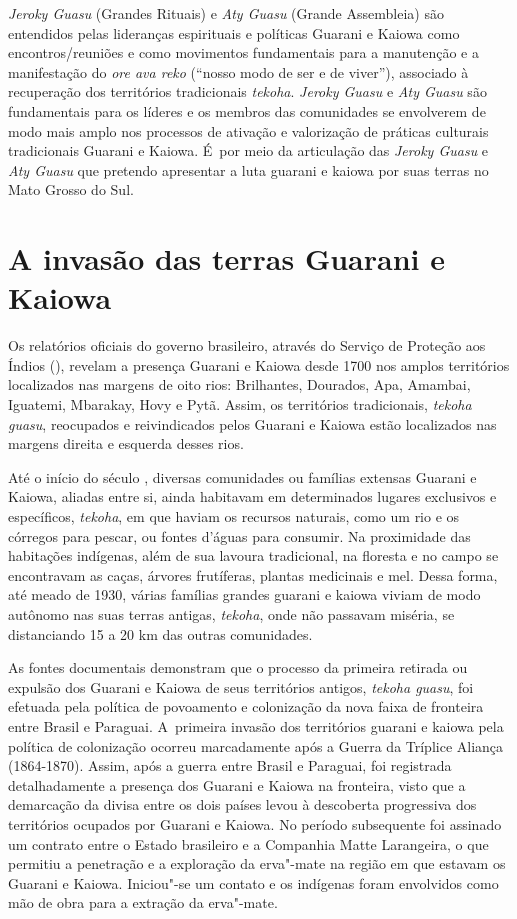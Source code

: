 \noindent
\emph{Jeroky Guasu} (Grandes Rituais) e \emph{Aty Guasu} (Grande Assembleia) são
entendidos pelas lideranças espirituais e políticas Guarani e Kaiowa
como encontros/reuniões e como movimentos fundamentais para a
manutenção e a manifestação do \emph{ore ava reko} (``nosso modo de ser e de
viver''), associado à recuperação dos territórios tradicionais \emph{tekoha}.
\emph{Jeroky Guasu} e \emph{Aty Guasu} são fundamentais para os líderes e os membros
das comunidades se envolverem de modo mais amplo nos processos de
ativação e valorização de práticas culturais tradicionais Guarani e
Kaiowa. É~por meio da articulação das \emph{Jeroky Guasu} e \emph{Aty Guasu} que
pretendo apresentar a luta guarani e kaiowa por suas terras no Mato
Grosso do Sul. 

\section{A invasão das terras Guarani e Kaiowa}

Os relatórios oficiais do governo brasileiro, através do Serviço de
Proteção aos Índios (), revelam a presença Guarani e Kaiowa desde
1700 nos amplos territórios localizados nas margens de oito rios:
Brilhantes, Dourados, Apa, Amambai, Iguatemi, Mbarakay, Hovy e Pytã.
Assim, os territórios tradicionais, \emph{tekoha guasu}, reocupados e
reivindicados pelos Guarani e Kaiowa estão localizados nas margens
direita e esquerda desses rios.

Até o início do século , diversas comunidades ou famílias extensas
Guarani e Kaiowa, aliadas entre si, ainda habitavam em determinados
lugares exclusivos e específicos, \emph{tekoha}, em que haviam os recursos
naturais, como um rio e os córregos para pescar, ou fontes d’águas para
consumir. Na proximidade das habitações indígenas, além de sua lavoura
tradicional, na floresta e no campo se encontravam as caças, árvores
frutíferas, plantas medicinais e mel. Dessa forma, até meado de 1930,
várias famílias grandes guarani e kaiowa viviam de modo autônomo nas
suas terras antigas, \emph{tekoha}, onde não passavam miséria, se distanciando
15 a 20 km das outras comunidades.

As fontes documentais demonstram que o processo da primeira retirada ou
expulsão dos Guarani e Kaiowa de seus territórios antigos, \emph{tekoha
guasu}, foi efetuada pela política de povoamento e colonização da nova
faixa de fronteira entre Brasil e Paraguai. A~primeira invasão dos
territórios guarani e kaiowa pela política de colonização ocorreu
marcadamente após a Guerra da Tríplice Aliança (1864-1870). Assim, após
a guerra entre Brasil e Paraguai, foi registrada detalhadamente a
presença dos Guarani e Kaiowa na fronteira, visto que a demarcação da
divisa entre os dois países levou à descoberta progressiva dos
territórios ocupados por Guarani e Kaiowa. No período subsequente foi
assinado um contrato entre o Estado brasileiro e a Companhia Matte
Larangeira, o que permitiu a penetração e a exploração da erva"-mate na
região em que estavam os Guarani e Kaiowa. Iniciou"-se um contato e os
indígenas foram envolvidos como mão de obra para a extração da
erva"-mate.

